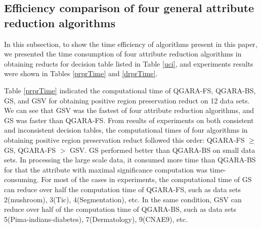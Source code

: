 \documentclass[review]{elsarticle}
\begin{document}
	\subsection{Efficiency comparison of four general attribute reduction algorithms}
		\par In this subsection, to show the time efficiency of algorithms present in this paper, we presented the time consumption of four attribute reduction algorithms in obtaining reducts for decision table listed in Table \ref{uci}, and experiments results were shown in Tables \ref{prprTime} and \ref{drprTime}.
		\par Table \ref{prprTime} indicated the computational time of QGARA-FS, QGARA-BS, GS, and GSV for obtaining positive region preservation reduct on 12 data sets. We can see that GSV was the fastest of four attribute reduction algorithms, and GS was faster than QGARA-FS. From results of experiments on both consistent and inconsistent decision tables, the computational times of four algorithms in obtaining positive region preservation reduct followed this order: QGARA-FS $\geq$ GS, QGARA-FS $>$ GSV. GS performed better than QGARA-BS on small data sets. In processing the large scale data, it consumed more time than QGARA-BS for that the attribute with maximal significance computation was time-consuming. For most of the cases in experiments, the computational time of GS can reduce over half the computation time of QGARA-FS, such as data sets 2(mushroom), 3(Tic), 4(Segmentation), etc. In the same condition, GSV can reduce over half of the computation time of QGARA-BS, such as data sets 5(Pima-indians-diabetes), 7(Dermatology), 9(CNAE9), etc.
\end{document}
